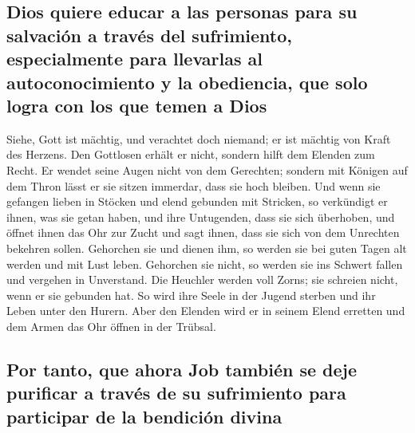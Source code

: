 \hypertarget{dios-quiere-educar-a-las-personas-para-su-salvaciuxf3n-a-travuxe9s-del-sufrimiento-especialmente-para-llevarlas-al-autoconocimiento-y-la-obediencia-que-solo-logra-con-los-que-temen-a-dios}{%
\subsection{Dios quiere educar a las personas para su salvación a través
del sufrimiento, especialmente para llevarlas al autoconocimiento y la
obediencia, que solo logra con los que temen a
Dios}\label{dios-quiere-educar-a-las-personas-para-su-salvaciuxf3n-a-travuxe9s-del-sufrimiento-especialmente-para-llevarlas-al-autoconocimiento-y-la-obediencia-que-solo-logra-con-los-que-temen-a-dios}}

 Siehe, Gott ist mächtig, und verachtet doch niemand; er
ist mächtig von Kraft des Herzens.  Den Gottlosen erhält
er nicht, sondern hilft dem Elenden zum Recht.  Er wendet
seine Augen nicht von dem Gerechten; sondern mit Königen auf dem Thron
lässt er sie sitzen immerdar, dass sie hoch bleiben.  Und
wenn sie gefangen lieben in Stöcken und elend gebunden mit Stricken,
 so verkündigt er ihnen, was sie getan haben, und ihre
Untugenden, dass sie sich überhoben,  und öffnet ihnen
das Ohr zur Zucht und sagt ihnen, dass sie sich von dem Unrechten
bekehren sollen.  Gehorchen sie und dienen ihm, so werden
sie bei guten Tagen alt werden und mit Lust leben. 
Gehorchen sie nicht, so werden sie ins Schwert fallen und vergehen in
Unverstand.  Die Heuchler werden voll Zorns; sie schreien
nicht, wenn er sie gebunden hat.  So wird ihre Seele in
der Jugend sterben und ihr Leben unter den Hurern.  Aber
den Elenden wird er in seinem Elend erretten und dem Armen das Ohr
öffnen in der Trübsal.

\hypertarget{por-tanto-que-ahora-job-tambiuxe9n-se-deje-purificar-a-travuxe9s-de-su-sufrimiento-para-participar-de-la-bendiciuxf3n-divina}{%
\subsection{Por tanto, que ahora Job también se deje purificar a través
de su sufrimiento para participar de la bendición
divina}\label{por-tanto-que-ahora-job-tambiuxe9n-se-deje-purificar-a-travuxe9s-de-su-sufrimiento-para-participar-de-la-bendiciuxf3n-divina}}

